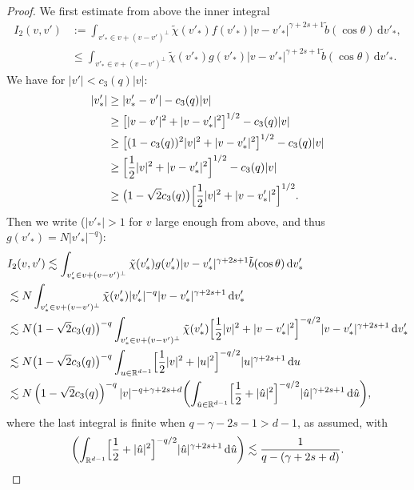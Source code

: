 \documentclass[11pt]{article}
\theoremstyle{plain}
\theoremstyle{definition}
\numberwithin{equation}{section}
\newcommand{\R}{\mathbb R}
\newcommand{\dd} {\, \mathrm{d}}
\let\A N
\begin{document}
\begin{proof}
We first estimate from above the inner integral
\[
\begin{aligned}
I_2(v,v') &:= \int_{v'_* \in v + (v-v')^\bot} \tilde \chi(v'_*) f(v'_*)
|v-v'_*|^{\gamma+2s +1} \tilde b(\cos \theta) \dd v'_* , \\
&\leq \int_{v'_* \in v + (v-v')^\bot} \tilde \chi(v'_*) g(v'_*)
|v-v'_*|^{\gamma+2s +1} \tilde b(\cos \theta) \dd v'_* .
\end{aligned}
\]
We have for $|v'|< c_3(q) |v|$:
\begin{align*}
|v'_*| &\ge |v'_*-v'|- c_3(q) |v| \\
& \ge \big[|v-v'|^2+|v-v'_*|^2\big]^{1/2} - c_3(q) |v| \\
& \ge \big[ (1-c_3(q))^2|v|^2 + |v-v'_*|^2\big]^{1/2} - c_3(q) |v|\\
& \ge \Bigl[ \frac12 |v|^2 + |v-v'_*|^2\Bigr]^{1/2} - c_3(q) |v|\\
& \ge \bigl(1-\sqrt 2c_3(q)\bigr) \Bigl[ \frac12|v|^2 + |v-v'_*|^2 \Bigr]^{1/2}.
\end{align*}
Then we write ($|v'_*| >1$ for $v$ large enough from above, and thus
$g(v'_*) = \A |v'_*|^{-q}$):
\begin{align*}
&I_2(v,v') \lesssim \int_{v'_* \in v + (v-v')^\bot} \tilde \chi(v'_*) g(v'_*)
|v-v'_*|^{\gamma+2s +1} \tilde b(\cos \theta) \dd v'_* \\
&\lesssim \A \int_{v'_* \in v + (v-v')^\bot} \tilde \chi(v'_*) |v'_*|^{-q}
|v-v'_*|^{\gamma+2s +1} \dd v'_* \\
&\lesssim \A \bigl(1-\sqrt{2} c_3(q) \bigr)^{-q} \int_{v'_* \in v + (v-v')^\bot} \tilde \chi(v'_*)
\Bigl[ \frac12 |v|^2 + |v-v'_*|^2\Bigr]^{-q/2}
|v-v'_*|^{\gamma+2s +1} \dd v'_* \\
&\lesssim \A \bigl(1-\sqrt{2} c_3(q) \bigr)^{-q} \int_{u \in
\R^{d-1}}
\Bigl[ \frac12 |v|^2 + |u|^2\Bigl]^{-q/2} |u|^{\gamma+2s +1} \dd u \\
&\lesssim \A \left(1-\sqrt 2 c_3(q)\right)^{-q} |v|^{-q+\gamma+2s +d}
\biggl( \int_{\hat u \in
\R^{d-1}}
\Bigl[ \frac12 + |\hat u|^2\Bigr]^{-q/2} |\hat u|^{\gamma+2s +1}
\dd \hat u \biggr),
\end{align*}
where the last integral is finite when $q -\gamma-2s -1 > d-1$, as
assumed, with
\begin{equation*}
\biggl( \int_{\R^{d-1}} \Bigl[ \frac12 + |\hat u|^2\Bigr]^{-q/2} |\hat u|^{\gamma+2s +1}
\dd \hat u \biggr) \lesssim \frac{1}{q - (\gamma+2s+d)}.
\end{equation*}


\end{proof}
\end{document}

